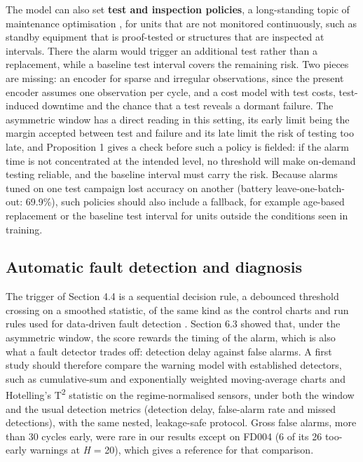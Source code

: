 \documentclass[a4paper,fleqn,doubleblind]{cas-dc}
\begin{document}
The model can also set \textbf{test and inspection policies}, a long-standing topic of maintenance optimisation \cite{dejonge2020}, for units that are not monitored continuously, such as standby equipment that is proof-tested or structures that are inspected at intervals. There the alarm would trigger an additional test rather than a replacement, while a baseline test interval covers the remaining risk. Two pieces are missing: an encoder for sparse and irregular observations, since the present encoder assumes one observation per cycle, and a cost model with test costs, test-induced downtime and the chance that a test reveals a dormant failure. The asymmetric window has a direct reading in this setting, its early limit being the margin accepted between test and failure and its late limit the risk of testing too late, and Proposition 1 gives a check before such a policy is fielded: if the alarm time is not concentrated at the intended level, no threshold will make on-demand testing reliable, and the baseline interval must carry the risk. Because alarms tuned on one test campaign lost accuracy on another (battery leave-one-batch-out: 69.9\%), such policies should also include a fallback, for example age-based replacement or the baseline test interval for units outside the conditions seen in training.

\subsection{Automatic fault detection and diagnosis}

The trigger of Section 4.4 is a sequential decision rule, a debounced threshold crossing on a smoothed statistic, of the same kind as the control charts and run rules used for data-driven fault detection \cite{venkatasubramanian2003}. Section 6.3 showed that, under the asymmetric window, the score rewards the timing of the alarm, which is also what a fault detector trades off: detection delay against false alarms. A first study should therefore compare the warning model with established detectors, such as cumulative-sum \cite{page1954} and exponentially weighted moving-average charts \cite{roberts1959} and Hotelling's T\textsuperscript{2} statistic on the regime-normalised sensors, under both the window and the usual detection metrics (detection delay, false-alarm rate and missed detections), with the same nested, leakage-safe protocol. Gross false alarms, more than 30 cycles early, were rare in our results except on FD004 (6 of its 26 too-early warnings at \textit{H} = 20), which gives a reference for that comparison.
\end{document}
